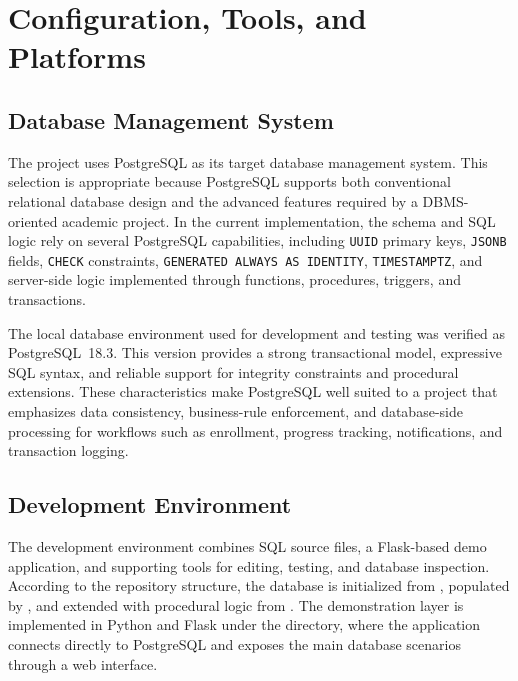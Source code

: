\chapter{Configuration, Tools, and Platforms}
\label{chap:configuration-tools-platforms}

\section{Database Management System}
The project uses PostgreSQL as its target database management system. This selection is appropriate because PostgreSQL supports both conventional relational database design and the advanced features required by a DBMS-oriented academic project. In the current implementation, the schema and SQL logic rely on several PostgreSQL capabilities, including \texttt{UUID} primary keys, \texttt{JSONB} fields, \texttt{CHECK} constraints, \texttt{GENERATED ALWAYS AS IDENTITY}, \texttt{TIMESTAMPTZ}, and server-side logic implemented through functions, procedures, triggers, and transactions.

The local database environment used for development and testing was verified as PostgreSQL~18.3. This version provides a strong transactional model, expressive SQL syntax, and reliable support for integrity constraints and procedural extensions. These characteristics make PostgreSQL well suited to a project that emphasizes data consistency, business-rule enforcement, and database-side processing for workflows such as enrollment, progress tracking, notifications, and transaction logging.


\section{Development Environment}
The development environment combines SQL source files, a Flask-based demo application, and supporting tools for editing, testing, and database inspection. According to the repository structure, the database is initialized from , populated by , and extended with procedural logic from . The demonstration layer is implemented in Python and Flask under the  directory, where the application connects directly to PostgreSQL and exposes the main database scenarios through a web interface.

